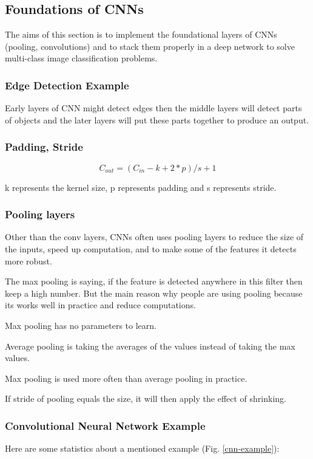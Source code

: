 \subsection{Foundations of CNNs}
The aims of this section is to implement the foundational layers of CNNs (pooling, convolutions) and to stack them properly in a deep network to solve multi-class image classification problems.

\subsubsection{Edge Detection Example}
Early layers of CNN might detect edges then the middle layers will detect parts of objects and the later layers will put these parts together to produce an output.

\subsubsection{Padding, Stride}
\begin{equation}
    C_{out} = (C_{in} - k + 2*p) / s + 1
\end{equation}

k represents the kernel size, p represents padding and s represents stride.

\subsubsection{Pooling layers}
Other than the conv layers, CNNs often uses pooling layers to reduce the size of the inputs, speed up computation, and to make some of the features it detects more robust.

The max pooling is saying, if the feature is detected anywhere in this filter then keep a high number. But the main reason why people are using pooling because its works well in practice and reduce computations.

Max pooling has no parameters to learn.

Average pooling is taking the averages of the values instead of taking the max values.

Max pooling is used more often than average pooling in practice.

If stride of pooling equals the size, it will then apply the effect of shrinking.

\subsubsection{Convolutional Neural Network Example}
Here are some statistics about a mentioned example (Fig. \ref{cnn-example}):

